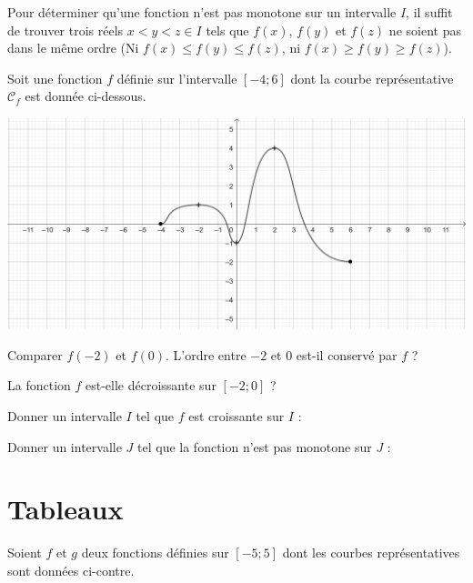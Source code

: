 \documentclass{article}
\begin{document}
\begin{remark}
Pour déterminer qu'une fonction n'est pas monotone sur un intervalle $I$, il suffit de trouver trois réels $x < y < z \in I$ tels que $f(x)$, $f(y)$ et $f(z)$ ne soient pas dans le même ordre (Ni $f(x) \leq f(y) \leq f(z)$, ni $f(x) \geq f(y) \geq f(z)$). 
\end{remark}
\begin{example}
Soit une fonction $f$ définie sur l'intervalle $[-4;6]$ dont la courbe représentative $\mathcal{C}_f$ est donnée ci-dessous.
\begin{center}
\includegraphics[width=\textwidth]{Var_Fonctions.png}
\end{center}
\begin{enumquestions}
\item Comparer $f(-2)$ et $f(0)$. L'ordre entre $-2$ et $0$ est-il conservé par $f$ ? \answersline
\item La fonction $f$ est-elle décroissante sur $[-2;0]$ ? \answersline
\item Donner un intervalle $I$ tel que $f$ est croissante sur $I$ : \answersline
\item Donner un intervalle $J$ tel que la fonction n'est pas monotone sur $J$ : \answersline
\end{enumquestions}
\end{example}
\newpage
\section{Tableaux}
Soient $f$ et $g$ deux fonctions définies sur $[-5;5]$ dont les courbes représentatives sont données ci-contre.
\vspace*{0.5cm}
\end{document}
